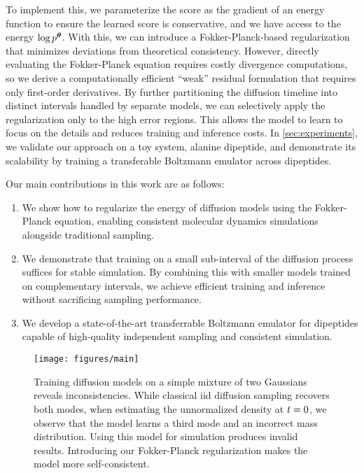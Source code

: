 To implement this, we parameterize the score as the gradient of an energy function to ensure the learned score is conservative, and we have access to the energy $\log p^{\bm{\theta}}$. With this, we can introduce a Fokker-Planck-based regularization that minimizes deviations from theoretical consistency. However, directly evaluating the Fokker-Planck equation requires costly divergence computations, so we derive a computationally efficient \enquote{weak} residual formulation that requires only first-order derivatives. By further partitioning the diffusion timeline into distinct intervals handled by separate models, we can selectively apply the regularization only to the high error regions. This allows the model to learn to focus on the details and reduces training and inference costs. In \cref{sec:experiments}, we validate our approach on a toy system, alanine dipeptide, and demonstrate its scalability by training a transferable Boltzmann emulator across dipeptides.

Our main contributions in this work are as follows:
\begin{enumerate}
    \item We show how to regularize the energy of diffusion models using the Fokker-Planck equation, enabling consistent molecular dynamics simulations alongside traditional sampling.
    \item We demonstrate that training on a small sub-interval of the diffusion process suffices for stable simulation. By combining this with smaller models trained on complementary intervals, we achieve efficient training and inference without sacrificing sampling performance.
    \item We develop a state-of-the-art transferrable Boltzmann emulator for dipeptides capable of high-quality independent sampling and consistent simulation. 
\end{enumerate}


\begin{figure}[t]
    \centering
    \texttt{[image: figures/main]}
    \caption{Training diffusion models on a simple mixture of two Gaussians reveals inconsistencies. While classical iid diffusion sampling recovers both modes, when estimating the unnormalized density at ${t}=0$, we observe that the model learns a third mode and an incorrect mass distribution. Using this model for simulation produces invalid results. Introducing our Fokker-Planck regularization makes the model more self-consistent. }
    \label{fig:main}
\end{figure}
